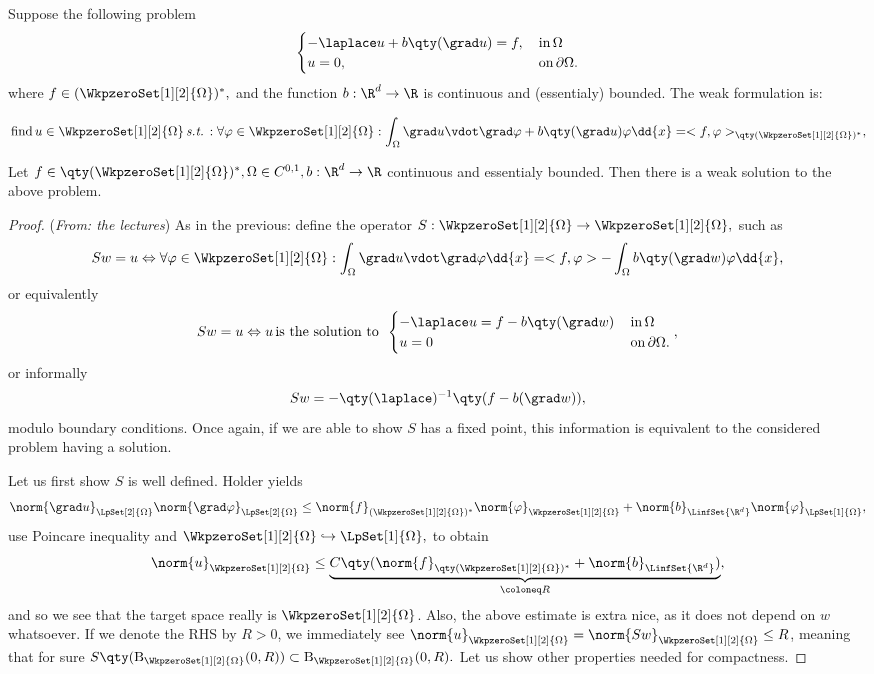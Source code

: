 \begin{example}
	Suppose the following problem
	\[
		\begin{cases}
			- \laplace u + b\qty(\grad u) = f, & \, \text{in} \, \Omega \\
			u = 0, & \, \text{on} \, \partial \Omega.
		\end{cases}
	\]
	where $f \in (\WkpzeroSet[1][2]{\Omega})^{*},$ and the function $b: \R^{d} \to \R$ is continuous and (essentialy) bounded. The weak formulation is: 

	\[
	\, \text{find} \,	u \in \WkpzeroSet[1][2]{\Omega} \, \text{\textit{s.t.}} \,: \forall \varphi \in \WkpzeroSet[1][2]{\Omega}: \int_{\Omega}\grad u \vdot \grad \varphi + b\qty(\grad u) \varphi\dd{x} = <f,\varphi>_{\qty(\WkpzeroSet[1][2]{\Omega})^{*}},
	\]

	\begin{theorem}
		Let $f \in \qty(\WkpzeroSet[1][2]{\Omega})^{*}, \Omega \in C^{0,1}, b: \R^d \to \R$ continuous and essentialy bounded. Then there is a weak solution to the above problem.
	\end{theorem}
	\begin{proof}(\textit{From: the lectures})
		As in the previous: define the operator $S: \WkpzeroSet[1][2]{\Omega} \to \WkpzeroSet[1][2]{\Omega},$  such as
		\[
			Sw = u \Leftrightarrow \forall \varphi \in \WkpzeroSet[1][2]{\Omega}: \int_{\Omega}\grad u \vdot \grad \varphi \dd{x} = <f, \varphi> - \int_{\Omega}b\qty(\grad w)\varphi \dd{x},
		\]
		or equivalently
		\[
			Sw = u \Leftrightarrow u \, \text{is the solution to } \,
			\begin{cases}
				- \laplace u = f - b\qty(\grad w) & \, \text{in} \, \Omega \\
				u = 0 & \, \text{on} \, \partial \Omega.
			\end{cases}, 
		\]
		or informally
		\[
			Sw = -\qty(\laplace)^{-1}\qty(f - b(\grad w)),
		\]
		modulo boundary conditions. Once again, if we are able to show $S$ has a fixed point, this information is equivalent to the considered problem having a solution.

		Let us first show $S$ is well defined. Holder yields
		\[
			\norm{\grad u}_{\LpSet[2]{\Omega}}\norm{\grad \varphi}_{\LpSet[2]{\Omega}} \leq \norm{f}_{(\WkpzeroSet[1][2]{\Omega})^{*}} \norm{\varphi}_{\WkpzeroSet[1][2]{\Omega}}+ \norm{b}_{\LinfSet{\R^{d}}} \norm{\varphi}_{\LpSet[1]{\Omega}},
		\]
		use Poincare inequality and $\WkpzeroSet[1][2]{\Omega} \hookrightarrow \LpSet[1]{\Omega},$ to obtain
		\[
			\norm{u}_{\WkpzeroSet[1][2]{\Omega}} \leq \underbrace{C\qty(\norm{f}_{\qty(\WkpzeroSet[1][2]{\Omega})^{*}}+ \norm{b}_{\LinfSet{\R^{d}}})}_{\coloneq R},
		\]
		and so we see that the target space really is $\WkpzeroSet[1][2]{\Omega}$. Also, the above estimate is extra nice, as it does not depend on $w$ whatsoever. If we denote the RHS by $R>0$, we immediately see $\norm{u}_{\WkpzeroSet[1][2]{\Omega}} = \norm{Sw}_{\WkpzeroSet[1][2]{\Omega}}\leq R$, meaning that for sure $S\qty(\text{B}_{\WkpzeroSet[1][2]{\Omega}}(0,R)) \subset \text{B}_{\WkpzeroSet[1][2]{\Omega}}(0,R).$
		Let us show other properties needed for compactness.



\end{proof}
\end{example}
